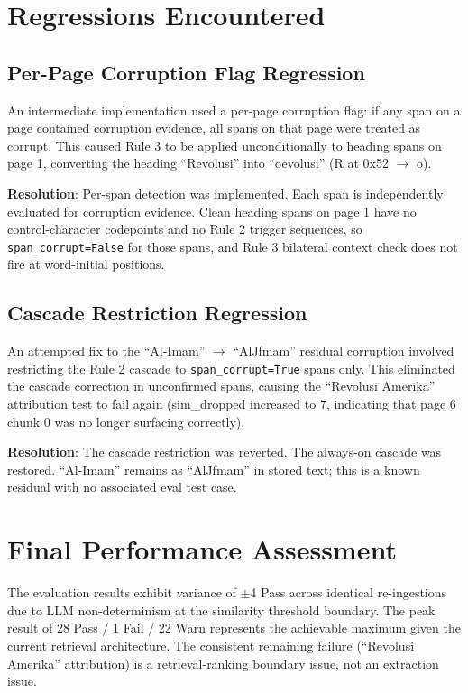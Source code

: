 \documentclass[12pt, a4paper]{report}
\newcommand{\codeinline}[1]{\texttt{#1}}
\begin{document}
\section{Regressions Encountered}

\subsection{Per-Page Corruption Flag Regression}

An intermediate implementation used a per-page corruption flag: if any span on
a page contained corruption evidence, all spans on that page were treated as
corrupt. This caused Rule 3 to be applied unconditionally to heading spans on
page 1, converting the heading ``Revolusi'' into ``oevolusi''
(R at 0x52 $\to$ o).

\textbf{Resolution}: Per-span detection was implemented. Each span is
independently evaluated for corruption evidence. Clean heading spans on page 1
have no control-character codepoints and no Rule 2 trigger sequences, so
\codeinline{span\_corrupt=False} for those spans, and Rule 3 bilateral context
check does not fire at word-initial positions.

\subsection{Cascade Restriction Regression}

An attempted fix to the ``Al-Imam'' $\to$ ``AlJfmam'' residual corruption
involved restricting the Rule 2 cascade to \codeinline{span\_corrupt=True}
spans only. This eliminated the cascade correction in unconfirmed spans,
causing the ``Revolusi Amerika'' attribution test to fail again (sim\_dropped
increased to 7, indicating that page 6 chunk 0 was no longer surfacing correctly).

\textbf{Resolution}: The cascade restriction was reverted. The always-on cascade
was restored. ``Al-Imam'' remains as ``AlJfmam'' in stored text; this is a
known residual with no associated eval test case.

\section{Final Performance Assessment}

The evaluation results exhibit variance of $\pm$4 Pass across identical
re-ingestions due to LLM non-determinism at the similarity threshold boundary.
The peak result of 28 Pass / 1 Fail / 22 Warn represents the achievable maximum
given the current retrieval architecture. The consistent remaining failure
(``Revolusi Amerika'' attribution) is a retrieval-ranking boundary issue, not
an extraction issue.
\end{document}

